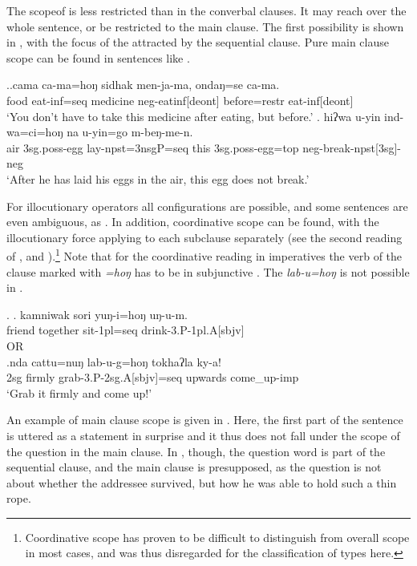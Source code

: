 The scopeof   is less restricted than in the converbal clauses. It may reach over  the whole sentence, or be restricted to the main clause. The first possibility is shown in \Next[a], with the focus of the  attracted by the sequential clause. Pure main clause scope can be found in sentences like \Next[b]. 

\ex.\ag.\label{camahong}cama ca-ma=hoŋ sidhak men-ja-ma, ondaŋ=se ca-ma.\\
			food eat{\sc -inf=seq} medicine {\sc neg-}eat{\sc inf[deont]} before={\sc restr} eat{\sc -inf[deont]}\\
			‘You don’t have to take this medicine after eating, but before.’
	\bg.	hiʔwa u-yin ind-wa=ci=hoŋ na u-yin=go m-beŋ-me-n.\\
			air {\sc 3sg.poss-}egg lay-{\sc npst=3nsgP=seq} this {\sc 3sg.poss-}egg={\sc top}  {\sc neg-}break{\sc -npst[3sg]-neg}\\
			‘After he has laid his eggs in the air, this egg does not break.’ 

			
For illocutionary operators all configurations are possible, and some sentences are even ambiguous, as \Next[a]. In addition,  coordinative scope can be found, with the illocutionary force applying to each subclause separately (see the second reading of \Next[a], and \Next[b]).\footnote{Coordinative scope has proven to be difficult to distinguish from overall scope in most cases, and was thus disregarded for the classification of  types here.} Note that for the coordinative reading in imperatives the verb of the clause marked with \emph{=hoŋ} has to be in subjunctive . The  \emph{lab-u=hoŋ} is not possible in \Next[b].

\ex. \ag. kamniwak sori yuŋ-i=hoŋ uŋ-u-m.\\
	friend together sit{\sc -1pl=seq} drink-3.P-1pl.A[sbjv]\\
		  OR\\
	\bg.\label{ex_hong_imp_coord}nda cattu=nuŋ lab-u-g=hoŋ tokhaʔla ky-a!\\
			{\sc 2sg} firmly grab{\sc -3.P-2sg.A[sbjv]=seq} upwards come\_up{\sc -imp}\\
			‘Grab it firmly and come up!’ 
			

An example of main clause scope is given in \Next[a]. Here, the first part of the sentence is uttered as a statement in surprise and it thus does not fall under the scope of the question in the main clause. In \Next[b], though, the question word is part of the sequential clause, and the main clause is presupposed, as the question is not about whether the addressee survived, but how he was able to hold such a thin rope.

